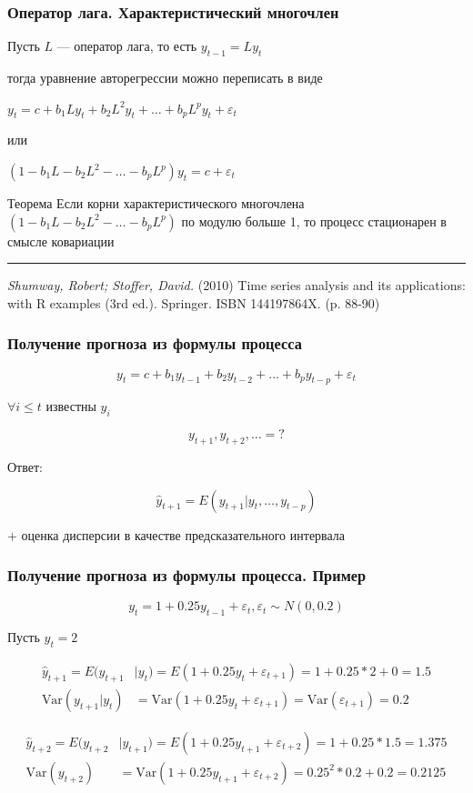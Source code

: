 \documentclass[fullscreen=true, bookmarks=true, hyperref={pdfencoding=unicode}]{beamer}
\begin{document}
\begin{frame}
  \frametitle{Оператор лага. Характеристический многочлен}

  Пусть $L$ — оператор лага, то есть $y_{t-1} = Ly_t$

  тогда уравнение авторегрессии можно переписать в виде

  $y_t = c + b_1Ly_t + b_2L^2y_t + \dots + b_pL^py_t + \varepsilon_t$

  или

  $(1 - b_1L - b_2L^2 - \dots - b_pL^p)y_t = c + \varepsilon_t$

  \begin{block}{Теорема}
    Если корни характеристического многочлена $(1 - b_1L - b_2L^2 - \dots - b_pL^p)$ по модулю больше 1, то процесс стационарен в смысле ковариации
  \end{block}

  \noindent\rule{8cm}{0.4pt}

  {\it Shumway, Robert; Stoffer, David.} (2010) Time series analysis and its applications: with R examples (3rd ed.). Springer. ISBN 144197864X. (p. 88-90)
\end{frame}


\begin{frame}
  \frametitle{Получение прогноза из формулы процесса}

  $$ y_t = c + b_1y_{t-1} + b_2y_{t-2} + \dots + b_py_{t-p} + \varepsilon_t $$

  $\forall i \leq t$ известны $y_i$

  $$ y_{t+1}, y_{t+2}, \dots = ? $$

  \vspace{1cm}
  Ответ:

  $$ \hat y_{t+1} = E (y_{t+1}| y_t, \dots, y_{t-p}) $$

  $+$ оценка дисперсии в качестве предсказательного интервала
\end{frame}


\begin{frame}
  \frametitle{Получение прогноза из формулы процесса. Пример}

  $$ y_t = 1 + 0.25y_{t-1} + \varepsilon_t, \varepsilon_t \sim N(0, 0.2) $$

  Пусть $y_t = 2$

  \begin{align*}
     \hat y_{t+1} = E(y_{t+1} &| y_{t}) = E(1 + 0.25y_{t} + \varepsilon_{t+1}) = 1 + 0.25*2 + 0 = 1.5 \\
     \text{Var}(y_{t+1} | y_{t}) &= \text{Var}(1 + 0.25y_{t} + \varepsilon_{t+1}) = \text{Var}(\varepsilon_{t+1}) = 0.2
  \end{align*}

  \begin{align*}
     \hat y_{t+2} = E(y_{t+2} &| y_{t+1}) = E(1 + 0.25y_{t+1} + \varepsilon_{t+2}) = 1 + 0.25 * 1.5 = 1.375 \\
     \text{Var}(y_{t+2}) &= \text{Var}(1 + 0.25y_{t+1} + \varepsilon_{t+2}) = 0.25^2 * 0.2 + 0.2 = 0.2125
     \end{align*}
\end{frame}
\end{document}
